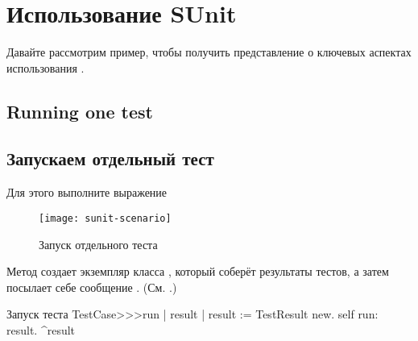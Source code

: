 \documentclass[a4paper,10pt,twoside]{book}
\begin{document}
\section{Использование SUnit}

Давайте рассмотрим пример, чтобы получить представление о ключевых аспектах использования \sunit.

\subsection{Running one test}
\subsection{Запускаем отдельный тест}

Для этого выполните выражение 

\begin{figure}[tbh]
  \begin{center}
		{\texttt{[image: sunit-scenario]}}
	\caption{Запуск отдельного теста}	
  \end{center}
\end{figure}

Метод  создает экземпляр класса ,
который соберёт результаты тестов, а затем посылает себе сообщение .
(См. .)

\begin{method}[tastecaserun]{Запуск теста}
TestCase>>>run
	| result |
	result := TestResult new.
	self run: result.
	^result
\end{method}
\end{document}

